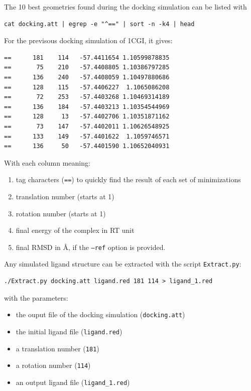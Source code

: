 \documentclass[12pt,a4paper]{article}
\begin{document}
The 10 best geometries found during the docking simulation can be listed with

\begin{verbatim}
cat docking.att | egrep -e "^==" | sort -n -k4 | head
\end{verbatim}

For the previsous docking simulation of 1CGI, it gives:

\begin{verbatim}
==      181    114   -57.4411654 1.10599878835
==       75    210   -57.4408805 1.10386797285
==      136    240   -57.4408059 1.10497880686
==      128    115   -57.4406227  1.1065086208
==       72    253   -57.4403268 1.10469314189
==      136    184   -57.4403213 1.10354544969
==      128     13   -57.4402706 1.10351871162
==       73    147   -57.4402011 1.10626548925
==      133    149   -57.4401622  1.1059746571
==      136     50   -57.4401590 1.10652040931
\end{verbatim}

With each column meaning:
\begin{enumerate}
\item tag characters ({\tt ==}) to quickly find the result of each set of minimizations
\item translation number (starts at 1)
\item rotation number (starts at 1)
\item final energy of the complex in RT unit
\item final RMSD in \AA, if the {\tt --ref} option is provided.
\end{enumerate}

Any simulated ligand structure can be extracted with the script {\tt Extract.py}:

\begin{verbatim}
./Extract.py docking.att ligand.red 181 114 > ligand_1.red
\end{verbatim}

with the parameters:
\begin{itemize}
\item the ouput file of the docking simulation ({\tt docking.att})
\item the initial ligand file ({\tt ligand.red})
\item a translation number ({\tt 181})
\item a rotation number ({\tt 114})
\item an output ligand file ({\tt ligand\_1.red})
\end{itemize}
\end{document}
